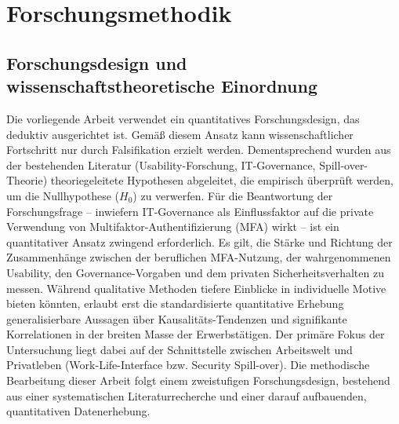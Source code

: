\section{Forschungsmethodik}
\subsection{Forschungsdesign und wissenschaftstheoretische Einordnung}
Die vorliegende Arbeit verwendet ein quantitatives Forschungsdesign, das deduktiv ausgerichtet ist. Gemäß diesem Ansatz kann wissenschaftlicher Fortschritt nur durch Falsifikation erzielt werden. Dementsprechend wurden aus der bestehenden Literatur (Usability-Forschung, IT-Governance, Spill-over-Theorie) theoriegeleitete Hypothesen abgeleitet, die empirisch überprüft werden, um die Nullhypothese ($H_0$) zu verwerfen.
Für die Beantwortung der Forschungsfrage -- inwiefern IT-Governance als Einflussfaktor auf die private Verwendung von Multifaktor-Authentifizierung (MFA) wirkt -- ist ein quantitativer Ansatz zwingend erforderlich. Es gilt, die Stärke und Richtung der Zusammenhänge zwischen der beruflichen MFA-Nutzung, der wahrgenommenen Usability, den Governance-Vorgaben und dem privaten Sicherheitsverhalten zu messen. Während qualitative Methoden tiefere Einblicke in individuelle Motive bieten könnten, erlaubt erst die standardisierte quantitative Erhebung generalisierbare Aussagen über Kausalitäts-Tendenzen und signifikante Korrelationen in der breiten Masse der Erwerbstätigen. Der primäre Fokus der Untersuchung liegt dabei auf der Schnittstelle zwischen Arbeitswelt und Privatleben (Work-Life-Interface bzw. Security Spill-over). 
Die methodische Bearbeitung dieser Arbeit folgt einem zweistufigen Forschungsdesign, bestehend aus einer systematischen Literaturrecherche und einer darauf aufbauenden, quantitativen Datenerhebung.

